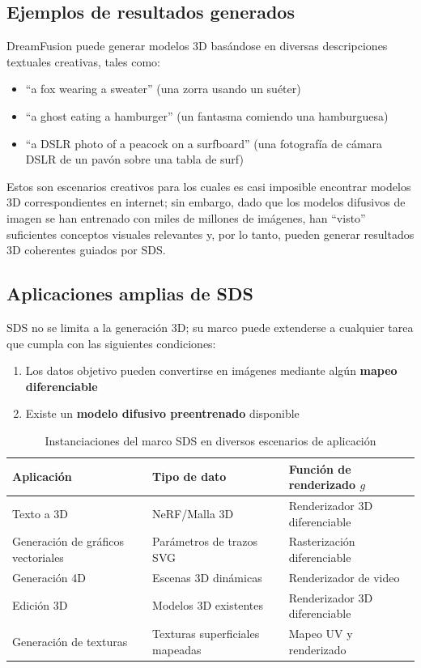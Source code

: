 \documentclass[a4paper]{article}
\begin{document}
\subsection{Ejemplos de resultados generados}

DreamFusion puede generar modelos 3D basándose en diversas descripciones textuales creativas, tales como:
\begin{itemize}
    \item ``a fox wearing a sweater'' (una zorra usando un suéter)
    \item ``a ghost eating a hamburger'' (un fantasma comiendo una hamburguesa)
    \item ``a DSLR photo of a peacock on a surfboard'' (una fotografía de cámara DSLR de un pavón sobre una tabla de surf)
\end{itemize}

Estos son escenarios creativos para los cuales es casi imposible encontrar modelos 3D correspondientes en internet; sin embargo, dado que los modelos difusivos de imagen se han entrenado con miles de millones de imágenes, han ``visto'' suficientes conceptos visuales relevantes y, por lo tanto, pueden generar resultados 3D coherentes guiados por SDS.

\subsection{Aplicaciones amplias de SDS}

SDS no se limita a la generación 3D; su marco puede extenderse a cualquier tarea que cumpla con las siguientes condiciones:
\begin{enumerate}
    \item Los datos objetivo pueden convertirse en imágenes mediante algún \textbf{mapeo diferenciable}
    \item Existe un \textbf{modelo difusivo preentrenado} disponible
\end{enumerate}

\begin{table}[H]
\centering
\begin{tabular}{lll}
\toprule
\textbf{Aplicación} & \textbf{Tipo de dato} & \textbf{Función de renderizado $g$} \\
\midrule
Texto a 3D & NeRF/Malla 3D & Renderizador 3D diferenciable \\
Generación de gráficos vectoriales & Parámetros de trazos SVG & Rasterización diferenciable \\
Generación 4D & Escenas 3D dinámicas & Renderizador de video \\
Edición 3D & Modelos 3D existentes & Renderizador 3D diferenciable \\
Generación de texturas & Texturas superficiales mapeadas & Mapeo UV y renderizado \\
\bottomrule
\end{tabular}
\caption{Instanciaciones del marco SDS en diversos escenarios de aplicación}
\end{table}
\end{document}

